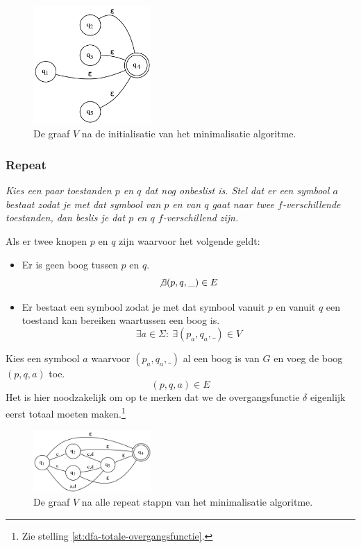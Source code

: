 \documentclass[main.tex]{subfiles}
\begin{document}
\begin{al}
  \begin{figure}[H]
    \centering
    \includegraphics[width=0.4\textwidth]{assets/dfa_minimalisatie-3.png}     
    \caption{De graaf $V$ na de initialisatie van het minimalisatie algoritme.}
    \label{fig:dfa-minimalisatie-3}
  \end{figure}

  \subsubsection{Repeat}
  \textit{
    Kies een paar toestanden $p$ en $q$ dat nog onbeslist is.
    Stel dat er een symbool $a$ bestaat zodat je met dat symbool van $p$ en van $q$ gaat naar twee $f$-verschillende toestanden, dan beslis je dat $p$ en $q$ $f$-verschillend zijn.
  }

  Als er twee knopen $p$ en $q$ zijn waarvoor het volgende geldt:
  \begin{itemize}
  \item Er is geen boog tussen $p$ en $q$.
    \[ \not\exists (p,q,\_) \in E \]
  \item Er bestaat een symbool zodat je met dat symbool vanuit $p$ en vanuit $q$ een toestand kan bereiken waartussen een boog is.
    \[ \exists a \in \Sigma:\ \exists(p_{a},q_{a},\_) \in V \]
  \end{itemize}
  Kies een symbool $a$ waarvoor $(p_{a},q_{a},\_)$ al een boog is van $G$ en voeg de boog $(p,q,a)$ toe.
  \[ (p,q,a) \in E \]
  Het is hier noodzakelijk om op te merken dat we de overgangsfunctie $\delta$ eigenlijk eerst totaal moeten maken.\footnote{Zie stelling \ref{st:dfa-totale-overgangsfunctie}.}

  \begin{figure}[H]
    \centering
    \includegraphics[width=0.4\textwidth]{assets/dfa_minimalisatie-4.png}     
    \caption{De graaf $V$ na alle repeat stappn van het minimalisatie algoritme.}
    \label{fig:dfa-minimalisatie-4}
  \end{figure}


\end{al}
\end{document}
